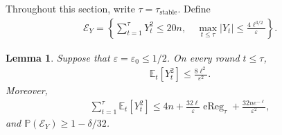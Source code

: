 \documentclass{article}
\newtheorem{lemma}[lemma]{Lemma}
\newcommand{\E}{\mathbb E}
\newcommand{\Pp}{\mathbb P}
\newcommand{\1}{\mathbf 1}
\newcommand{\eps}{\varepsilon}
\begin{document}
Throughout this section, write $\tau=\tau_{\mathrm{stable}}$. Define
\begin{align}
    \mathcal E_Y
    =\left\{
    \sum_{t=1}^\tau Y_t^2\leq20n,
    \quad
    \max_{t\leq\tau}|Y_t|\leq\frac{4\ell^{3/2}}{\eps}
    \right\}.
    \label{eq:feedback-good-event}
\end{align}
\begin{lemma}
    \label{lem:feedback}
    Suppose that $\eps=\eps_0\leq1/2$. On every round $t\leq\tau$,
    \begin{align}
        \E_t[Y_t^2]\leq\frac{8\ell^2}{\eps^2}.
        \label{eq:feedback-roundwise}
    \end{align}
    Moreover,
    \begin{align}
        \sum_{t=1}^\tau\E_t[Y_t^2]
        \leq4n+\frac{32\ell}{\eps}\operatorname{eReg}_\tau
        +\frac{32ne^{-\ell}}{\eps^2},
        \label{eq:feedback-self-bound}
    \end{align}
    and $\Pp(\mathcal E_Y)\geq1-\delta/32$.
\end{lemma}
\end{document}
